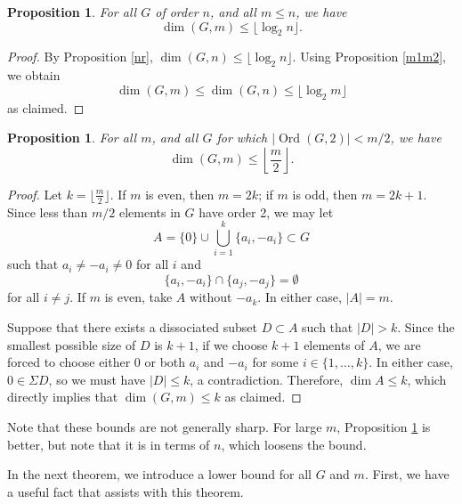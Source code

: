 \documentclass[11pt]{article}
\newcommand{\N}{\mathbb{N}}
\newcommand{\Z}{\mathbb{Z}}
\newtheorem{lem}[thm]{Lemma}
\newtheorem{prop}[thm]{Proposition}
\begin{document}
\begin{prop}\label{logn}
    For all $G$ of order $n$, and all $m\leq n$, we have
    \[\dim(G,m)\leq\lfloor \log_2 n \rfloor.\]
\end{prop}
\begin{proof}
    By Proposition \ref{nr}, $\dim(G,n)\leq\lfloor\log_2 n\rfloor.$ Using Proposition \ref{m1m2}, we obtain
    \[\dim(G,m)\leq\dim(G,n)\leq\lfloor\log_2 m\rfloor\]
    as claimed.
\end{proof}

\begin{prop}\label{m/2}
For all $m$, and all $G$ for which $|\!\operatorname{Ord}(G,2)|<m/2$, we have $$\dim(G,m)\leq \left\lfloor \frac{m}{2}\right\rfloor.$$
\end{prop}
\begin{proof}
Let $k=\lfloor \frac{m}{2}\rfloor$. If $m$ is even, then $m=2k$; if $m$ is odd, then $m=2k+1$. Since less than $m/2$ elements in $G$ have order 2, we may let
\[A=\{0\}\cup\bigcup_{i=1}^k \{a_i,-a_i\}\subset G\]
such that $a_i\neq -a_i\neq 0$ for all $i$ and
\[\{a_i,-a_i\}\cap\{a_j,-a_j\}=\emptyset\]
for all $i\neq j$. If $m$ is even, take $A$ without $-a_k$.
    In either case, $|A|=m$. 
    
    Suppose that there exists a dissociated subset $D\subset A$ such that $|D|> k$. Since the smallest possible size of $D$ is $k+1$, if we choose $k+1$ elements of $A$, we are forced to choose either 0 or both $a_i$ and $-a_i$ for some $i\in \{1,\ldots,k\}$. In either case, $0\in \Sigma D$, so we must have $|D|\leq k$, a contradiction. Therefore, $\dim A\leq k$, which directly implies that $\dim(G,m)\leq k$ as claimed.
\end{proof}

Note that these bounds are not generally sharp. For large $m$, Proposition \ref{logn} is better, but note that it is in terms of $n$, which loosens the bound.

\newpage
In the next theorem, we introduce a lower bound for all $G$ and $m$. First, we have a useful fact that assists with this theorem.
\end{document}
